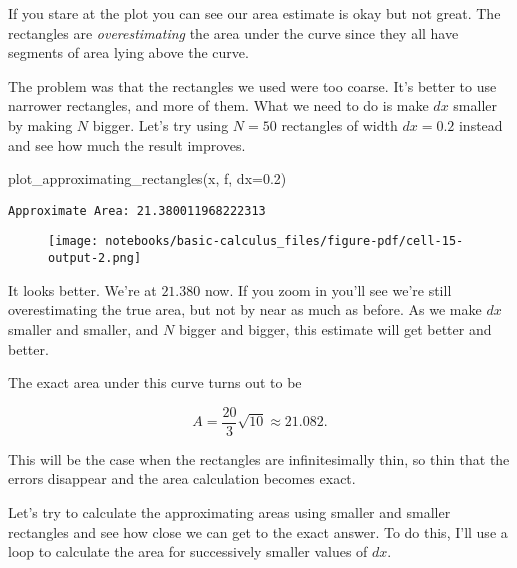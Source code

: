 \documentclass[
  letterpaper,
  DIV=11,
  numbers=noendperiod]{scrreprt}
\newenvironment{Shaded}{\begin{snugshade}}{\end{snugshade}}
\newcommand{\FloatTok}[1]{\textcolor[rgb]{0.68,0.00,0.00}{#1}}
\newcommand{\NormalTok}[1]{\textcolor[rgb]{0.00,0.23,0.31}{#1}}
\newcommand{\OperatorTok}[1]{\textcolor[rgb]{0.37,0.37,0.37}{#1}}
\begin{document}
If you stare at the plot you can see our area estimate is okay but not
great. The rectangles are \emph{overestimating} the area under the curve
since they all have segments of area lying above the curve.

The problem was that the rectangles we used were too coarse. It's better
to use narrower rectangles, and more of them. What we need to do is make
\(dx\) smaller by making \(N\) bigger. Let's try using \(N=50\)
rectangles of width \(dx=0.2\) instead and see how much the result
improves.

\begin{Shaded}
\begin{Highlighting}[]
\NormalTok{plot\_approximating\_rectangles(x, f, dx}\OperatorTok{=}\FloatTok{0.2}\NormalTok{)}
\end{Highlighting}
\end{Shaded}

\begin{verbatim}
Approximate Area: 21.380011968222313
\end{verbatim}

\begin{figure}[H]

{\centering \texttt{[image: notebooks/basic-calculus\_files/figure-pdf/cell-15-output-2.png]}

}

\end{figure}

It looks better. We're at \(21.380\) now. If you zoom in you'll see
we're still overestimating the true area, but not by near as much as
before. As we make \(dx\) smaller and smaller, and \(N\) bigger and
bigger, this estimate will get better and better.

The exact area under this curve turns out to be

\[A = \frac{20}{3}\sqrt{10} \approx 21.082.\]

This will be the case when the rectangles are infinitesimally thin, so
thin that the errors disappear and the area calculation becomes exact.

Let's try to calculate the approximating areas using smaller and smaller
rectangles and see how close we can get to the exact answer. To do this,
I'll use a loop to calculate the area for successively smaller values of
\(dx\).
\end{document}
